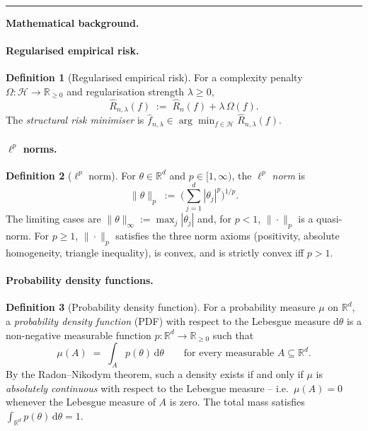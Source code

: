 \documentclass[11pt]{article}
\theoremstyle{definition}
\newtheorem{definition}{Definition}
\begin{document}
\bigskip
\hrule
\bigskip

\noindent\textbf{Mathematical background.}

\paragraph{Regularised empirical risk.}

\begin{definition}[Regularised empirical risk]
For a complexity penalty $\Omega : \mathcal{H} \to \mathbb{R}_{\geq 0}$ and
regularisation strength $\lambda \geq 0$,
\[
  \widehat{R}_{n, \lambda}(f) \;:=\; \widehat{R}_n(f) + \lambda\,\Omega(f).
\]
The \emph{structural risk minimiser} is
$\widehat{f}_{n, \lambda} \in \arg\min_{f \in \mathcal{H}} \widehat{R}_{n, \lambda}(f)$.
\end{definition}

\paragraph{$\ell^{p}$ norms.}

\begin{definition}[$\ell^{p}$ norm]
For $\theta \in \mathbb{R}^{d}$ and $p \in [1, \infty)$, the \emph{$\ell^{p}$
norm} is
\[
  \|\theta\|_{p} \;:=\; \Biggl(\sum_{j=1}^{d} |\theta_j|^{p}\Biggr)^{1/p}.
\]
The limiting cases are
$\|\theta\|_{\infty} := \max_{j} |\theta_{j}|$ and, for $p < 1$,
$\|\cdot\|_{p}$ is a quasi-norm. For $p \geq 1$, $\|\cdot\|_{p}$ satisfies
the three norm axioms (positivity, absolute homogeneity, triangle
inequality), is convex, and is strictly convex iff $p > 1$.
\end{definition}

\paragraph{Probability density functions.}

\begin{definition}[Probability density function]
For a probability measure $\mu$ on $\mathbb{R}^{d}$, a \emph{probability
density function} (PDF) with respect to the Lebesgue measure $\mathrm{d}\theta$
is a non-negative measurable function $p : \mathbb{R}^{d} \to \mathbb{R}_{\geq 0}$
such that
\[
  \mu(A) \;=\; \int_{A} p(\theta)\, \mathrm{d}\theta
  \qquad \text{for every measurable } A \subseteq \mathbb{R}^{d}.
\]
By the Radon--Nikodym theorem, such a density exists if and only if $\mu$
is \emph{absolutely continuous} with respect to the Lebesgue measure -- i.e.\
$\mu(A) = 0$ whenever the Lebesgue measure of $A$ is zero. The total mass
satisfies $\int_{\mathbb{R}^{d}} p(\theta)\, \mathrm{d}\theta = 1$.
\end{definition}
\end{document}
